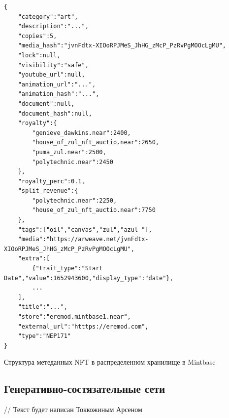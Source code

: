 \begin{listing}
\begin{verbatim}
{
    "category":"art",
    "description":"...",
    "copies":5,
    "media_hash":"jvnFdtx-XIOoRPJMeS_JhHG_zMcP_PzRvPgMOOcLgMU",
    "lock":null,
    "visibility":"safe",
    "youtube_url":null,
    "animation_url":"...",
    "animation_hash":"...",
    "document":null,
    "document_hash":null,
    "royalty":{
        "genieve_dawkins.near":2400,
        "house_of_zul_nft_auctio.near":2650,
        "puma_zul.near":2500,
        "polytechnic.near":2450
    },
    "royalty_perc":0.1,
    "split_revenue":{
        "polytechnic.near":2250,
        "house_of_zul_nft_auctio.near":7750
    },
    "tags":["oil","canvas","zul","azul "],
    "media":"https://arweave.net/jvnFdtx-XIOoRPJMeS_JhHG_zMcP_PzRvPgMOOcLgMU",
    "extra":[
        {"trait_type":"Start Date","value":1652943600,"display_type":"date"},
        ...
    ],
    "title":"...",
    "store":"eremod.mintbase1.near",
    "external_url":"htttps://eremod.com",
    "type":"NEP171"
}

\end{verbatim}
\caption{Структура метеданных NFT в распределенном хранилище в Mintbase}
\label{lst.mintbase.nftstructmeta}
\end{listing}

\subsection{Генеративно-состязательные сети}

// Текст будет написан Токкожиным Арсеном
